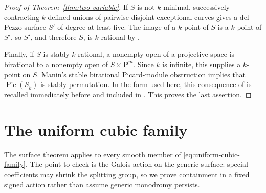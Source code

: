 \documentclass[11pt]{article}
\theoremstyle{remark}
\newcommand{\PP}{\mathbf P}
\newcommand{\Pic}{\operatorname{Pic}}
\begin{document}
\begin{proof}[Proof of Theorem~\ref{thm:two-variable}]
If \(S\) is not \(k\)-minimal, successively contracting \(k\)-defined unions
of pairwise disjoint exceptional curves gives a del Pezzo surface \(S'\) of
degree at least five.  The image of a \(k\)-point of \(S\) is a \(k\)-point
of \(S'\), so \(S'\), and therefore \(S\), is \(k\)-rational by
\cite[Theorem~2.1]{VarillyAlvarado}.

Finally, if \(S\) is stably \(k\)-rational, a nonempty open of a projective
space is birational to a nonempty open of \(S\times\PP^m\).  Since \(k\) is
infinite, this supplies a \(k\)-point on \(S\).  Manin's stable birational
Picard-module obstruction implies that \(\Pic(S_{\bar k})\) is stably
permutation.  In
the form used here, this consequence of \cite[Theorem~2.2]{Manin1966} is
recalled immediately before \cite[Proposition~4.1]{TZ} and included in
\cite[Corollary~4.3]{TZ}.  This proves the last assertion.
%
%
\end{proof}

\section{The uniform cubic family}\label{sec:uniform-family}

The surface theorem applies to every smooth member of
\eqref{eq:uniform-cubic-family}. The point to check is the Galois action on
the generic surface: special coefficients may shrink the splitting group,
so we prove containment in a fixed signed action rather than assume generic
monodromy persists.
\end{document}
